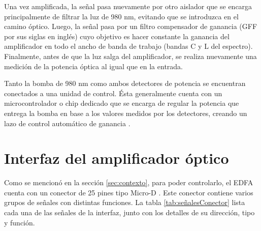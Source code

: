 Una vez amplificada, la señal pasa nuevamente por otro aislador que se encarga principalmente de filtrar la luz de 980 nm, evitando que se introduzca en el camino óptico. Luego, la señal pasa por un filtro compensador de ganancia (GFF por sus siglas en inglés) cuyo objetivo es hacer constante la ganancia del amplificador en todo el ancho de banda de trabajo (bandas C y L del espectro). Finalmente, antes de que la luz salga del amplificador, se realiza nuevamente una medición de la potencia óptica al igual que en la entrada.

Tanto la bomba de 980 nm como ambos detectores de potencia se encuentran conectados a una unidad de control. Ésta generalmente cuenta con un microcontrolador o chip dedicado que se encarga de regular la potencia que entrega la bomba en base a los valores medidos por los detectores, creando un lazo de control automático de ganancia \citep{WEBSITE:EDFA1}\citep{WEBSITE:EDFA2}.

\section{Interfaz del amplificador óptico}
\label{sec:intAmp}

Como se mencionó en la sección \ref{sec:contexto}, para poder controlarlo, el EDFA cuenta con un conector de 25 pines tipo Micro-D \citep{WEBSITE:MICROD_DS}. Este conector contiene varios grupos de señales con distintas funciones. La tabla \ref{tab:señalesConector} lista cada una de las señales de la interfaz, junto con los detalles de su dirección, tipo y función.

